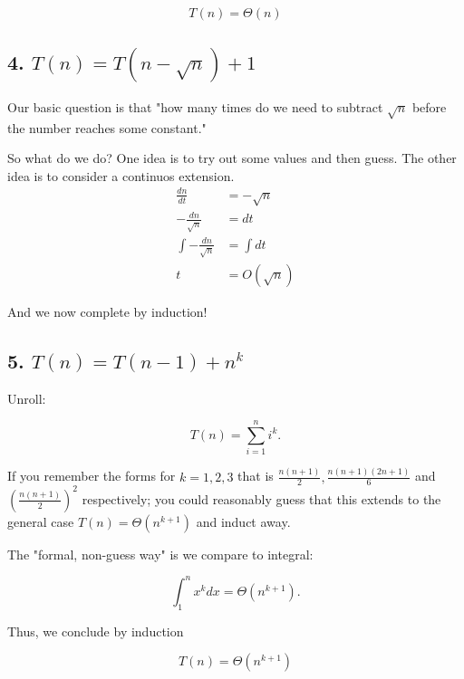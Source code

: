 \documentclass[11pt]{article}
\begin{document}
\[
\boxed{T(n)=\Theta(n)}
\]

\newpage

\subsection{4. $T(n)=T(n-\sqrt{n})+1$}

Our basic question is that "how many times do we need to subtract $\sqrt{n}$ before the number reaches some constant."

So what do we do? One idea is to try out some values and then guess. The other idea is to consider a continuos extension.
\begin{align*}
\frac{d n}{d t} &= - \sqrt{n}\\
-\frac{d n}{\sqrt{n}} &= d t\\
\int -\frac{d n}{\sqrt{n}} &= \int d t\\
t &= O(\sqrt{n})
\end{align*}

And we now complete by induction!


\newpage

\subsection{5. $T(n)=T(n-1)+n^k$}

Unroll:

\[
T(n)=\sum_{i=1}^n i^k.
\]

If you remember the forms for $k = 1, 2, 3$ that is $\frac{n (n+1)}{2}, \frac{n (n+1) (2n + 1)}{6}$ and $(\frac{n (n+1)}{2})^2$ respectively; you could reasonably guess that this extends to the general case $T(n)=\Theta(n^{k+1})$ and induct away.

The "formal, non-guess way" is we compare to integral:

\[
\int_1^n x^k dx = \Theta(n^{k+1}).
\]

Thus, we conclude by induction

\[
\boxed{T(n)=\Theta(n^{k+1})}
\]

\end{document}
